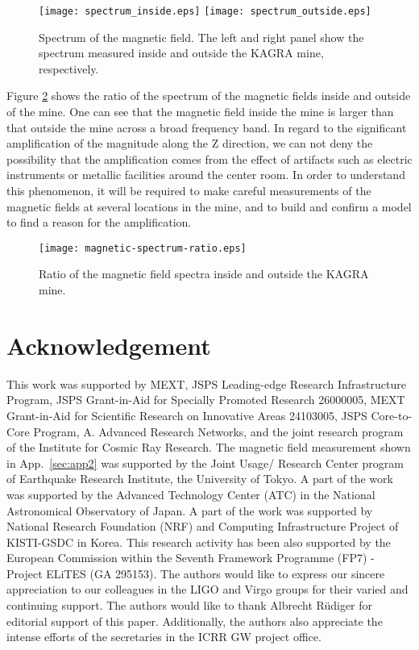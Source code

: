 \documentclass[prd ,twocolumn ,secnumarabic,dvips
,amssymb, amsmath,nobibnotes, aps, prd,superscriptaddress]{revtex4-1}
\begin{document}
{\begin{figure}
\begin{center}
\texttt{[image: spectrum\_inside.eps]}
\texttt{[image: spectrum\_outside.eps]}
\vspace{-0.2cm}
\caption{Spectrum of the magnetic field. The left and right panel show the spectrum measured inside and outside the KAGRA mine, respectively.}
\label{fig:mag_out}
\end{center}
\end{figure}

Figure \ref{fig:mag_in} shows the ratio of the spectrum of the magnetic fields inside and outside of the mine. One can see that the magnetic field inside the mine is larger than that outside the mine across a broad frequency band. In regard to the significant amplification of the magnitude along the Z direction, we can not deny the possibility that the amplification comes 
from the effect of artifacts such as electric instruments or metallic 
facilities around the center room. In order to understand this 
phenomenon, it will be required to make careful measurements of the magnetic 
fields at several locations in the mine, and to build and confirm a model 
to find a reason for the amplification.


\begin{figure}
\begin{center}
\texttt{[image: magnetic-spectrum-ratio.eps]}
\vspace{-0.2cm}
\caption{Ratio of the magnetic field spectra inside and outside the KAGRA mine.}
\label{fig:mag_in}
\end{center}
\end{figure}

\section*{Acknowledgement}
%
This work was supported by MEXT, JSPS Leading-edge Research Infrastructure Program, JSPS Grant-in-Aid for Specially Promoted Research 26000005, MEXT Grant-in-Aid for Scientific Research on Innovative Areas 24103005, JSPS Core-to-Core Program, A. Advanced Research Networks, and the joint research program of the Institute for Cosmic Ray Research. The magnetic field measurement shown in App.~\ref{sec:app2} was supported by the Joint Usage/ Research Center program of Earthquake Research Institute, the University of Tokyo. A part of the work was supported by the Advanced Technology Center (ATC) in the National Astronomical Observatory of Japan. A part of the work was supported by National Research Foundation (NRF) and Computing Infrastructure Project of KISTI-GSDC in Korea. This research activity has been also supported by the European Commission within the Seventh Framework Programme (FP7) - Project ELiTES (GA 295153). The authors would like to express our sincere appreciation to our colleagues in the LIGO and Virgo groups for their varied and continuing support. The authors would like to thank Albrecht R\"{u}diger for editorial support of this paper. Additionally, the authors also appreciate the intense efforts of the secretaries in the ICRR GW project office. 



}
\end{document}
